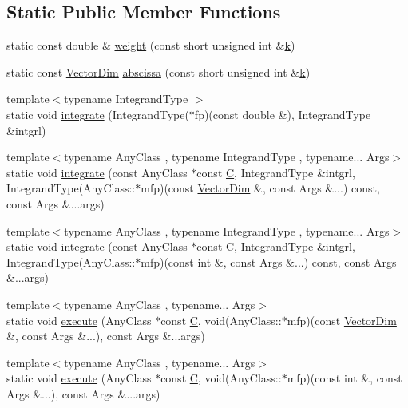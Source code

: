 \subsection*{Static Public Member Functions}
\begin{DoxyCompactItemize}
\item 
static const double \& \hyperlink{structmodel_1_1_quadrature_a3f2af629e2685213b887788b54530255}{weight} (const short unsigned int \&\hyperlink{_f_e_m_2linear__elasticity__3d_2tetgen_2generate_p_o_l_ycube_8m_a5d2aad4440da75aa43f2643e72b1a3bd}{k})
\item 
static const \hyperlink{structmodel_1_1_quadrature_af457aed3f503be1010dee155c33f7ec1}{Vector\+Dim} \hyperlink{structmodel_1_1_quadrature_a49f409b9ee29aa206cbe316f707d4acb}{abscissa} (const short unsigned int \&\hyperlink{_f_e_m_2linear__elasticity__3d_2tetgen_2generate_p_o_l_ycube_8m_a5d2aad4440da75aa43f2643e72b1a3bd}{k})
\item 
{\footnotesize template$<$typename Integrand\+Type $>$ }\\static void \hyperlink{structmodel_1_1_quadrature_a8820266eebe25109afe7e4cab4eda438}{integrate} (Integrand\+Type($\ast$fp)(const double \&), Integrand\+Type \&intgrl)
\item 
{\footnotesize template$<$typename Any\+Class , typename Integrand\+Type , typename... Args$>$ }\\static void \hyperlink{structmodel_1_1_quadrature_aa80b4c0d760e59a4351c470e9ccf738c}{integrate} (const Any\+Class $\ast$const \hyperlink{plot_cells_8m_aaa53ca0b650dfd85c4f59fa156f7a2cc}{C}, Integrand\+Type \&intgrl, Integrand\+Type(Any\+Class\+::$\ast$mfp)(const \hyperlink{structmodel_1_1_quadrature_af457aed3f503be1010dee155c33f7ec1}{Vector\+Dim} \&, const Args \&...) const, const Args \&...args)
\item 
{\footnotesize template$<$typename Any\+Class , typename Integrand\+Type , typename... Args$>$ }\\static void \hyperlink{structmodel_1_1_quadrature_a8017fe27223310ab200e78b9f8b9b7e5}{integrate} (const Any\+Class $\ast$const \hyperlink{plot_cells_8m_aaa53ca0b650dfd85c4f59fa156f7a2cc}{C}, Integrand\+Type \&intgrl, Integrand\+Type(Any\+Class\+::$\ast$mfp)(const int \&, const Args \&...) const, const Args \&...args)
\item 
{\footnotesize template$<$typename Any\+Class , typename... Args$>$ }\\static void \hyperlink{structmodel_1_1_quadrature_aa3bba314906243153409fc6056375d4c}{execute} (Any\+Class $\ast$const \hyperlink{plot_cells_8m_aaa53ca0b650dfd85c4f59fa156f7a2cc}{C}, void(Any\+Class\+::$\ast$mfp)(const \hyperlink{structmodel_1_1_quadrature_af457aed3f503be1010dee155c33f7ec1}{Vector\+Dim} \&, const Args \&...), const Args \&...args)
\item 
{\footnotesize template$<$typename Any\+Class , typename... Args$>$ }\\static void \hyperlink{structmodel_1_1_quadrature_ab96947496c79a63095e52e70b2cce24b}{execute} (Any\+Class $\ast$const \hyperlink{plot_cells_8m_aaa53ca0b650dfd85c4f59fa156f7a2cc}{C}, void(Any\+Class\+::$\ast$mfp)(const int \&, const Args \&...), const Args \&...args)
\end{DoxyCompactItemize}
